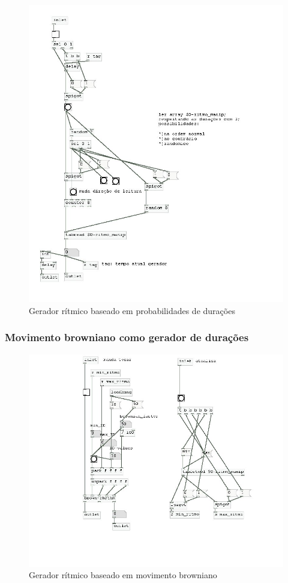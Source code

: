 \documentclass{ppgmus}
\begin{document}
\begin{figure}[!ht]
\includegraphics[scale=.6]{gerador-ritmico1}
\caption{Gerador rítmico baseado em probabilidades de durações}
\label{gera-ritmico1}
\end{figure}  




 \subsubsection{Movimento browniano como gerador de durações}


\begin{figure}[!ht]
\includegraphics[scale=.6]{gerador-ritmico2}
\caption{Gerador rítmico baseado em movimento browniano}
\label{gera-ritmico2}
\end{figure}  
\end{document}
